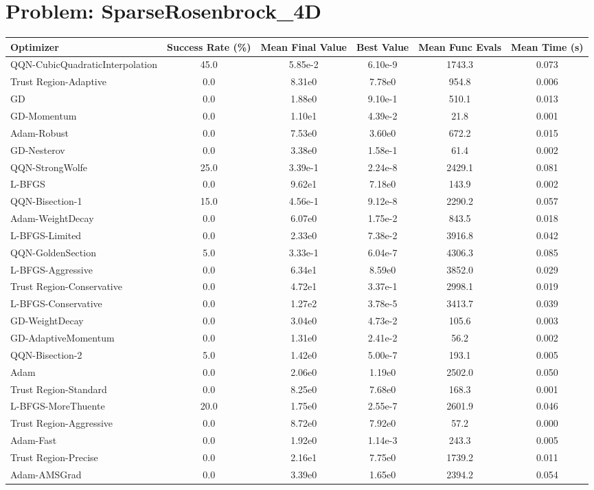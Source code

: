 \documentclass{article}
\begin{document}
\section{Problem: SparseRosenbrock\_4D}
\begin{longtable}{p{3cm}*{5}{c}}
\toprule
\textbf{Optimizer} & \textbf{Success Rate (\%)} & \textbf{Mean Final Value} & \textbf{Best Value} & \textbf{Mean Func Evals} & \textbf{Mean Time (s)} \\
\midrule
QQN-CubicQuadraticInterpolation & 45.0 & 5.85e-2 & 6.10e-9 & 1743.3 & 0.073 \\
Trust Region-Adaptive & 0.0 & 8.31e0 & 7.78e0 & 954.8 & 0.006 \\
GD & 0.0 & 1.88e0 & 9.10e-1 & 510.1 & 0.013 \\
GD-Momentum & 0.0 & 1.10e1 & 4.39e-2 & 21.8 & 0.001 \\
Adam-Robust & 0.0 & 7.53e0 & 3.60e0 & 672.2 & 0.015 \\
GD-Nesterov & 0.0 & 3.38e0 & 1.58e-1 & 61.4 & 0.002 \\
QQN-StrongWolfe & 25.0 & 3.39e-1 & 2.24e-8 & 2429.1 & 0.081 \\
L-BFGS & 0.0 & 9.62e1 & 7.18e0 & 143.9 & 0.002 \\
QQN-Bisection-1 & 15.0 & 4.56e-1 & 9.12e-8 & 2290.2 & 0.057 \\
Adam-WeightDecay & 0.0 & 6.07e0 & 1.75e-2 & 843.5 & 0.018 \\
L-BFGS-Limited & 0.0 & 2.33e0 & 7.38e-2 & 3916.8 & 0.042 \\
QQN-GoldenSection & 5.0 & 3.33e-1 & 6.04e-7 & 4306.3 & 0.085 \\
L-BFGS-Aggressive & 0.0 & 6.34e1 & 8.59e0 & 3852.0 & 0.029 \\
Trust Region-Conservative & 0.0 & 4.72e1 & 3.37e-1 & 2998.1 & 0.019 \\
L-BFGS-Conservative & 0.0 & 1.27e2 & 3.78e-5 & 3413.7 & 0.039 \\
GD-WeightDecay & 0.0 & 3.04e0 & 4.73e-2 & 105.6 & 0.003 \\
GD-AdaptiveMomentum & 0.0 & 1.31e0 & 2.41e-2 & 56.2 & 0.002 \\
QQN-Bisection-2 & 5.0 & 1.42e0 & 5.00e-7 & 193.1 & 0.005 \\
Adam & 0.0 & 2.06e0 & 1.19e0 & 2502.0 & 0.050 \\
Trust Region-Standard & 0.0 & 8.25e0 & 7.68e0 & 168.3 & 0.001 \\
L-BFGS-MoreThuente & 20.0 & 1.75e0 & 2.55e-7 & 2601.9 & 0.046 \\
Trust Region-Aggressive & 0.0 & 8.72e0 & 7.92e0 & 57.2 & 0.000 \\
Adam-Fast & 0.0 & 1.92e0 & 1.14e-3 & 243.3 & 0.005 \\
Trust Region-Precise & 0.0 & 2.16e1 & 7.75e0 & 1739.2 & 0.011 \\
Adam-AMSGrad & 0.0 & 3.39e0 & 1.65e0 & 2394.2 & 0.054 \\
\bottomrule
\end{longtable}
\end{document}

